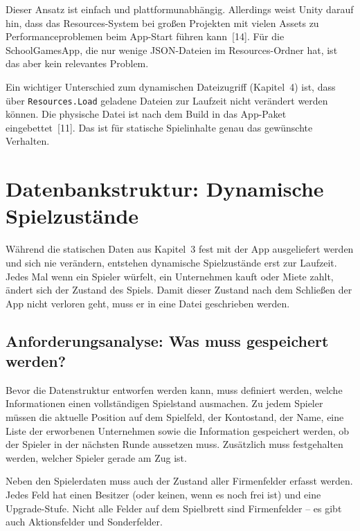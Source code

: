 \documentclass[12pt,a4paper]{article}
\begin{document}
Dieser Ansatz ist einfach und plattformunabhängig. Allerdings weist Unity darauf hin, dass das Resources-System bei großen Projekten mit vielen Assets zu Performanceproblemen beim App-Start führen kann~[14]. Für die SchoolGamesApp, die nur wenige JSON-Dateien im Resources-Ordner hat, ist das aber kein relevantes Problem.

Ein wichtiger Unterschied zum dynamischen Dateizugriff (Kapitel~4) ist, dass über \texttt{Resources.Load} geladene Dateien zur Laufzeit nicht verändert werden können. Die physische Datei ist nach dem Build in das App-Paket eingebettet~[11]. Das ist für statische Spielinhalte genau das gewünschte Verhalten.


\section{Datenbankstruktur: Dynamische Spielzustände}

Während die statischen Daten aus Kapitel~3 fest mit der App ausgeliefert werden und sich nie verändern, entstehen dynamische Spielzustände erst zur Laufzeit. Jedes Mal wenn ein Spieler würfelt, ein Unternehmen kauft oder Miete zahlt, ändert sich der Zustand des Spiels. Damit dieser Zustand nach dem Schließen der App nicht verloren geht, muss er in eine Datei geschrieben werden.

\subsection{Anforderungsanalyse: Was muss gespeichert werden?}

Bevor die Datenstruktur entworfen werden kann, muss definiert werden, welche Informationen einen vollständigen Spielstand ausmachen. Zu jedem Spieler müssen die aktuelle Position auf dem Spielfeld, der Kontostand, der Name, eine Liste der erworbenen Unternehmen sowie die Information gespeichert werden, ob der Spieler in der nächsten Runde aussetzen muss. Zusätzlich muss festgehalten werden, welcher Spieler gerade am Zug ist.

Neben den Spielerdaten muss auch der Zustand aller Firmenfelder erfasst werden. Jedes Feld hat einen Besitzer (oder keinen, wenn es noch frei ist) und eine Upgrade-Stufe. Nicht alle Felder auf dem Spielbrett sind Firmenfelder -- es gibt auch Aktionsfelder und Sonderfelder.
\end{document}
